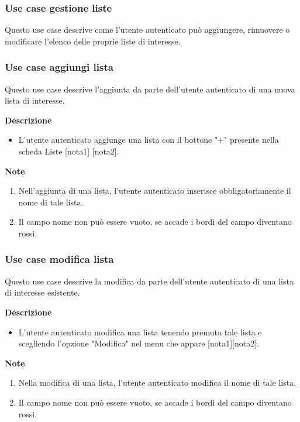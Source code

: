 \documentclass[a4paper,12pt]{article}
\begin{document}
\subsubsection*{Use case gestione liste}

Questo use case descrive come l'utente autenticato può aggiungere, rimuovere o modificare l'elenco delle proprie liste di interesse.


\subsubsection*{Use case aggiungi lista}

Questo use case descrive l'aggiunta da parte dell'utente autenticato di una nuova lista di interesse.

\textbf{Descrizione}
\begin{itemize} \setlength\itemsep{0.01em}
\item L'utente autenticato aggiunge una lista con il bottone "+" presente nella scheda Liste [nota1] [nota2].
\end{itemize}

\textbf{Note}
\begin{enumerate} \setlength\itemsep{0.01em}
\item Nell'aggiunta di una lista, l'utente autenticato inserisce obbligatoriamente il nome di tale lista.
\item Il campo nome non può essere vuoto, se accade i bordi del campo diventano rossi.
\end{enumerate}


\subsubsection*{Use case modifica lista}

Questo use case descrive la modifica da parte dell'utente autenticato di una lista di interesse esistente.

\textbf{Descrizione}
\begin{itemize} \setlength\itemsep{0.01em}
\item L'utente autenticato modifica una lista tenendo premuta tale lista e scegliendo l'opzione "Modifica" nel menu che appare [nota1][nota2].
\end{itemize}

\textbf{Note}
\begin{enumerate} \setlength\itemsep{0.01em}
\item Nella modifica di una lista, l'utente autenticato modifica il nome di tale lista.
\item Il campo nome non può essere vuoto, se accade i bordi del campo diventano rossi.
\end{enumerate}
\end{document}
